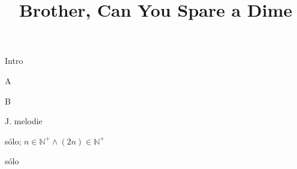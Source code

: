\documentclass[timestamp]{jazzgrid}
\title{\textbf{Brother, Can You Spare a Dime}}
\begin{document}
\maketitle
\begin{musicsection}{Intro}
\barline
	{\barfour{}
		{}
		{}
		{}
		{}
	}
	{\barfour{}
		{}
		{}
		{}
		{}
	}
	{\barfour{}
		{}
		{}
		{}
		{}
	}
	{\barfour{}
		{}
		{}
		{}
		{}
	}
\barline
	{\barfour{}
		{}
		{}
		{}
		{}
	}
	{\barfour{}
		{}
		{}
		{}
		{}
	}
	{\barfour{}
		{}
		{}
		{}
		{}
	}
	{\barfour{}
		{}
		{}
		{}
		{}
	}
\barline
	{\barfour{}
		{}
		{}
		{}
		{}
	}
	{\barfour{}
		{}
		{}
		{}
		{}
	}
	{\barfour{}
		{}
		{}
		{}
		{}
	}
	{\barfour{}
		{}
		{}
		{}
		{}
	}
\barline
	{\barfour{}
		{}
		{}
		{}
		{}
	}
	{\barfour{}
		{}
		{}
		{}
		{}
	}
	{\barfour{}
		{}
		{}
		{}
		{}
	}
	{\barfour{}
		{}
		{}
		{}
		{}
	}
\end{musicsection}
\begin{musicsection}{A}
\barline
	{\barfour{}
		{}
		{}
		{}
		{}
	}
	{\barfour{}
		{}
		{}
		{}
		{}
	}
	{\barfour{}
		{}
		{}
		{}
		{}
	}
	{\barfour{}
		{}
		{}
		{}
		{}
	}
\barline
	{\barfour{}
		{}
		{}
		{}
		{}
	}
	{\barfour{}
		{}
		{}
		{}
		{}
	}
	{\barfour{}
		{}
		{}
		{}
		{}
	}
	{
		{}
		{}
		{}
		{}
	}
	{
		{}
		{}
		{}
		{}
	}
\end{musicsection}
\begin{musicsection}{B}
\barline
	{\barfour{}
		{}
		{}
		{}
		{}
	}
	{\barfour{}
		{}
		{}
		{}
		{}
	}
	{\barfour{}
		{}
		{}
		{}
		{}
	}
	{\barfour{}
		{}
		{}
		{}
		{}
	}
\barline
	{\barfour{}
		{}
		{}
		{}
		{}
	}
	{\barfour{}
		{}
		{}
		{}
		{}
	}
	{\barfour{}
		{}
		{}
		{}
		{}
	}
	{\barfour{}
		{}
		{}
		{}
		{}
	}
\end{musicsection}
\begin{multicols*}{2}
\scriptsize
\begin{description}[noitemsep,align=right,labelwidth=\widthof{\bfseries{AABABA}}]
	\item [Intro]
	\item [AABABA] J. melodie
	\item [{$[$AA$]_n$}] sólo; $n \in \mathbb{N}^+ \land (2n) \in \mathbb{N}^+$
	\item [BA] sólo
\end{description}
\end{multicols*}
\end{document}
